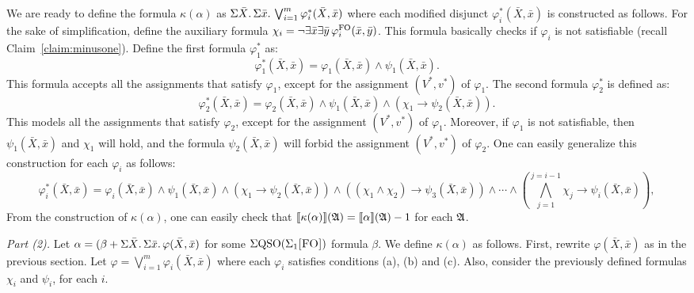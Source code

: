 We are ready to define the formula  $\kappa(\alpha)$ as $\Sigma{\bar{X}}.\,\Sigma{\bar{x}}.\, \bigvee_{i = 1}^m\varphi_i^*(\bar{X},\bar{x})$
where each modified disjunct $\varphi_i^*(\bar{X},\bar{x})$ is constructed as follows. 
For the sake of simplification, define the auxiliary formula $\chi_i = \neg\exists\bar{x}\exists\bar{y}\,\varphi^{{\rm FO}}_i(\bar{x},\bar{y})$. 
This formula basically checks if $\varphi_i$ is not satisfiable (recall Claim~\ref{claim:minusone}).
Define the first formula $\varphi_1^*$ as:
$$
\varphi^*_1(\bar{X},\bar{x}) = \varphi_1(\bar{X},\bar{x})\wedge\psi_1(\bar{X},\bar{x}).
$$
This formula accepts all the assignments that satisfy $\varphi_1$, except for the assignment $(V^*,v^*)$ of $\varphi_1$. The second formula $\varphi_2^*$ is defined as:
$$
\varphi^*_2(\bar{X},\bar{x}) = \varphi_2(\bar{X},\bar{x})\wedge\psi_1(\bar{X},\bar{x})\wedge(\chi_1\to\psi_2(\bar{X},\bar{x})).
$$
This models all the assignments that satisfy $\varphi_2$, except for the assignment $(V^*,v^*)$ of $\varphi_1$. Moreover, if $\varphi_1$ is not satisfiable, then $\psi_1(\bar{X},\bar{x})$ and $\chi_1$ will hold, and the formula $\psi_2(\bar{X},\bar{x})$ will forbid the assignment $(V^*,v^*)$ of $\varphi_2$. 
One can easily generalize this construction for each $\varphi_i$ as follows:
$$
\varphi_i^*(\bar{X},\bar{x}) = \varphi_i(\bar{X},\bar{x})\wedge\psi_1(\bar{X},\bar{x})\wedge(\chi_1\to\psi_2(\bar{X},\bar{x}))\wedge((\chi_1\wedge\chi_2)\to\psi_3(\bar{X},\bar{x}))\wedge\cdots\wedge(
\bigwedge_{j = 1}^{j = i-1}\chi_j\to\psi_i(\bar{X},\bar{x})),
$$
From the construction of $\kappa(\alpha)$, one can easily check that  ${\llbracket{}{\kappa(\alpha)}\rrbracket}(\mathfrak{A}) = {\llbracket{}{\alpha}\rrbracket}(\mathfrak{A})-1$ for each $\mathfrak{A}$.

\vspace{1em}

{\em Part (2).} Let $\alpha = (\beta + \Sigma{\bar{X}}.\,\Sigma{\bar{x}}.\, \varphi(\bar{X},\bar{x})$ for some $\Sigma{\rm QSO}(\Sigma_{1}\textsc{[FO]})$ formula $\beta$. We define $\kappa(\alpha)$ as follows.
First, rewrite $\varphi(\bar{X},\bar{x})$ as in the previous section. Let $\varphi = \bigvee_{i = 1}^m\varphi_i(\bar{X},\bar{x})$ where each $\varphi_i$ satisfies conditions (a), (b) and (c). Also, consider the previously defined formulas $\chi_i$ and $\psi_i$, for each $i$. 

